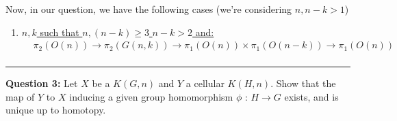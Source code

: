 \documentclass[11pt]{article}
\begin{document}
Now, in our question, we have the following cases (we're considering $n, n-k > 1$)

\begin{enumerate}
  \item \underline{$n, k$ such that $n, (n-k) \geq 3$ $n - k > 2$ and:}
  \begin{align*}
    &\pi_2(O(n)) \rightarrow \pi_2(G(n, k)) \rightarrow \pi_1(O(n)) \times \pi_1(O(n-k)) \rightarrow \pi_1(O(n)) \\
  \end{align*}
\end{enumerate}



\vskip 0.5cm
\hrule
\pagebreak



\begin{bluebox}
  \textbf{Question 3:} Let $X$ be a $K(G, n)$ and $Y$ a cellular $K(H, n)$. Show that the map of $Y$ to $X$ inducing a given group homomorphism $\phi \text{ : } H \rightarrow G$ exists, and is unique up to homotopy.
\end{bluebox}
\end{document}
